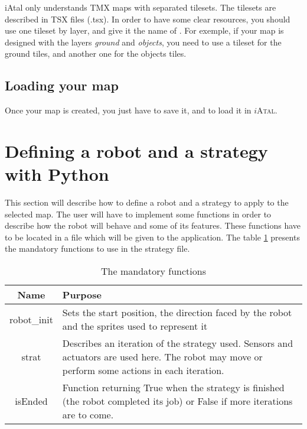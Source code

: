 \documentclass[a4paper,11pt]{article}
\newcommand\iAtal{$i$\textsc{Atal}}
\begin{document}
iAtal only understands TMX maps with separated tilesets. The tilesets
are described in TSX files (.tsx). In order to have some clear
resources, you should use one tileset by layer, and give it the name of
. For exemple, if your
map is designed with the layers \textit{ground} and \textit{objects},
you need to use a tileset for the ground tiles, and another one for
the objects tiles.


\subsection{Loading your map}

Once your map is created, you just have to save it, and to load it in
\iAtal{}.


\section{Defining a robot and a strategy with Python}

This section will describe how to define a robot and a strategy to
apply to the selected map. The user will have to implement some
functions in order to describe how the robot will behave and some of
its features. These functions have to be located in a file which will
be given to the application. The table \ref{tab:PyMandatoryFunc}
presents the mandatory functions to use in the strategy file.

\begin{table}[h]
  \begin{center}
    \begin{tabular}{|c|p{10cm}|}
      \hline
      Name & Purpose \\
      \hline
      robot\_init & Sets the start position, the direction faced by the
      robot and the sprites used to represent it \\
      \hline
      strat & Describes an iteration of the strategy used. Sensors and
      actuators are used here. The robot may move or perform some
      actions in each iteration. \\
      \hline
      isEnded & Function returning True when the strategy is finished
      (the robot completed its job) or False if more iterations are to
      come.\\ 
      \hline 
    \end{tabular}
    \caption{\label{tab:PyMandatoryFunc} The mandatory functions}
  \end{center}
\end{table}
\end{document}
